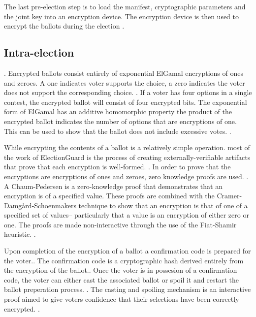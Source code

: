 The last pre-election step is to load the manifest, cryptographic parameters and the joint key into an encryption device. The encryption device is then used to encrypt the ballots during the election \cite[8]{eg-paper}.

\subsection{Intra-election}.
Encrypted ballots consist entirely of exponential ElGamal encryptions of ones and zeroes. A one indicates voter supports the choice, a zero indicates the voter does not support the corresponding choice. \cite[11]{eg-paper} \cite[12]{eg-spec}. If a voter has four options in a single contest, the encrypted ballot will consist of four encrypted bits. The exponential form of ElGamal has an additive homomorphic property the product of the encrypted ballot indicates the number of options that are encryptions of one. This can be used to show that the ballot does not include excessive votes. \cite[5]{eg-spec}.

While encrypting the contents of a ballot is a relatively simple operation. most of the work of ElectionGuard is the process of creating externally-verifiable artifacts that prove that each encryption is well-formed. \cite[3]{eg-spec}. In order to prove that the encryptions are encryptions of ones and zeroes, zero knowledge proofs are used. \cite[11]{eg-paper}. A Chaum-Pedersen is a zero-knowledge proof that demonstrates that an encryption is of a specified value. These proofs are combined with the Cramer-Damgård-Schoenmakers technique to show that an encryption is that of one of a specified set of values– particularly that a value is an encryption of either zero or one. The proofs are made non-interactive through the use of the Fiat-Shamir heuristic. \cite[6,13]{eg-spec}.

Upon completion of the encryption of a ballot a confirmation code is prepared for the voter.\cite[17]{eg-spec}. The confirmation code is a cryptographic hash derived entirely from the encryption of the ballot.\cite[14]{eg-paper}. Once the voter is in possesion of a confirmation code, the voter can either cast the associated ballot or spoil it and restart the ballot preperation process. \cite[17]{eg-spec}. The casting and spoiling mechanism is an interactive proof aimed to give voters confidence that their selections have been correctly encrypted. \cite{eg-docs}.


